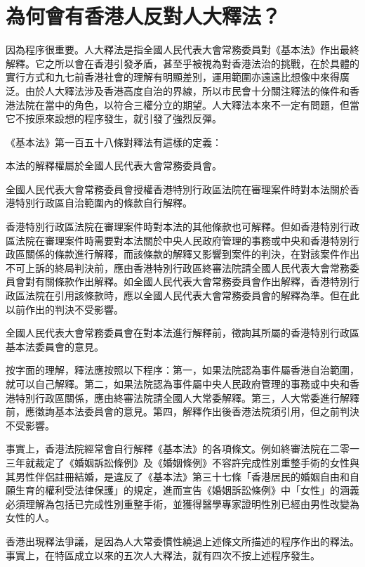 \section{為何會有香港人反對人大釋法？}
\label{sec:sec25}

因為程序很重要。人大釋法是指全國人民代表大會常務委員對《基本法》作出最終解釋。它之所以會在香港引發矛盾，甚至乎被視為對香港法治的挑戰，在於具體的實行方式和九七前香港社會的理解有明顯差別，運用範圍亦遠遠比想像中來得廣泛。由於人大釋法涉及香港高度自治的界線，所以市民會十分關注釋法的條件和香港法院在當中的角色，以符合三權分立的期望。人大釋法本來不一定有問題，但當它不按原來設想的程序發生，就引發了強烈反彈。

《基本法》第一百五十八條對釋法有這樣的定義：

\begin{displayquote}
    本法的解釋權屬於全國人民代表大會常務委員會。

    全國人民代表大會常務委員會授權香港特別行政區法院在審理案件時對本法關於香港特別行政區自治範圍內的條款自行解釋。

    香港特別行政區法院在審理案件時對本法的其他條款也可解釋。但如香港特別行政區法院在審理案件時需要對本法關於中央人民政府管理的事務或中央和香港特別行政區關係的條款進行解釋，而該條款的解釋又影響到案件的判決，在對該案件作出不可上訴的終局判決前，應由香港特別行政區終審法院請全國人民代表大會常務委員會對有關條款作出解釋。如全國人民代表大會常務委員會作出解釋，香港特別行政區法院在引用該條款時，應以全國人民代表大會常務委員會的解釋為準。但在此以前作出的判決不受影響。

    全國人民代表大會常務委員會在對本法進行解釋前，徵詢其所屬的香港特別行政區基本法委員會的意見。
\end{displayquote}

按字面的理解，釋法應按照以下程序：第一，如果法院認為事件屬香港自治範圍，就可以自己解釋。第二，如果法院認為事件屬中央人民政府管理的事務或中央和香港特別行政區關係，應由終審法院請全國人大常委解釋。第三，人大常委進行解釋前，應徵詢基本法委員會的意見。第四，解釋作出後香港法院須引用，但之前判決不受影響。

事實上，香港法院經常會自行解釋《基本法》的各項條文。例如終審法院在二零一三年就裁定了《婚姻訴訟條例》及《婚姻條例》不容許完成性別重整手術的女性與其男性伴侶註冊結婚，是違反了《基本法》第三十七條「香港居民的婚姻自由和自願生育的權利受法律保護」的規定，進而宣告《婚姻訴訟條例》中「女性」的涵義必須理解為包括已完成性別重整手術，並獲得醫學專家證明性別已經由男性改變為女性的人。

香港出現釋法爭議，是因為人大常委慣性繞過上述條文所描述的程序作出的釋法。事實上，在特區成立以來的五次人大釋法，就有四次不按上述程序發生。

